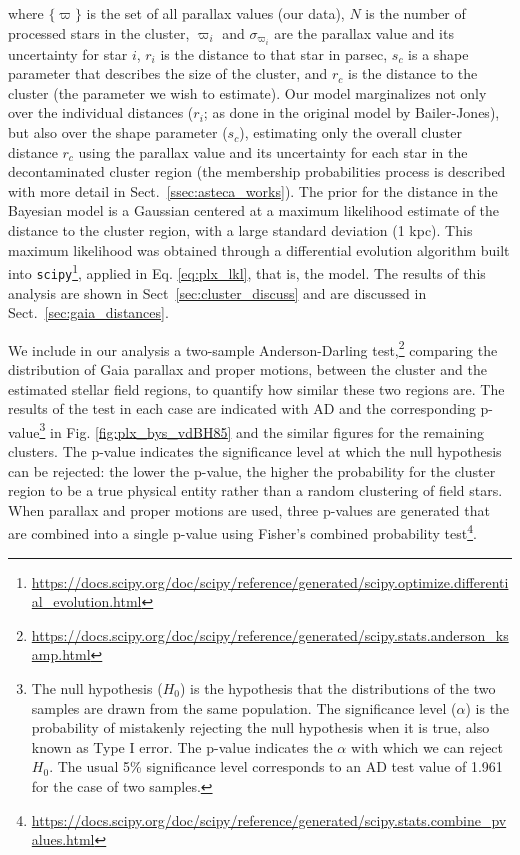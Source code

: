 \documentclass[draft]{aa}
\begin{document}
\noindent where $\{\varpi\}$ is the set of all parallax values (our
data), $N$ is the number of processed stars in the cluster,
$\varpi_{i}$ and $\sigma_{\varpi_{i}}$ are the parallax value and its
uncertainty for star $i$, $r_{i}$ is the distance to that star in parsec,
$s_{c}$ is a shape parameter that describes the size of the cluster, and
$r_{c}$ is the distance to the cluster (the parameter we wish to estimate).
%
Our model marginalizes not only over the individual distances ($r_i$;
as done in the original model by Bailer-Jones), but also
over the shape parameter ($s_c$), estimating only the overall cluster distance
$r_c$ using the parallax value and its uncertainty for each star in the
decontaminated cluster region (the membership probabilities process is
described with more detail in Sect.~\ref{ssec:asteca_works}).
%
The prior for the distance in the Bayesian model is a Gaussian centered at a
maximum likelihood estimate of the distance to the cluster region, with a large
standard deviation (1 kpc). This maximum likelihood was
obtained through a differential evolution algorithm built into
\texttt{scipy}\footnote{\url{https://docs.scipy.org/doc/scipy/reference/generated/scipy.optimize.differential_evolution.html}},
applied in Eq. \ref{eq:plx_lkl}, that is, the model.
%
The results of this analysis are shown in Sect~\ref{sec:cluster_discuss}
and are discussed in Sect.~\ref{sec:gaia_distances}.

We include in our analysis a two-sample Anderson-Darling
test,\footnote{\url{https://docs.scipy.org/doc/scipy/reference/generated/scipy.stats.anderson_ksamp.html}}
comparing the distribution of Gaia parallax and proper motions,
between the cluster and the estimated stellar field regions, to quantify how
similar these two regions are.
The results of the test in each case are indicated with AD and the
corresponding p-value\footnote{The null hypothesis ($H_{0}$) is the
hypothesis that the distributions of the two samples are drawn from the same
population. The significance level ($\alpha$) is the probability of mistakenly
rejecting the null hypothesis when it is true, also known as Type I error. The
p-value indicates the $\alpha$ with which we can reject $H_{0}$. The usual 5\%
significance level corresponds to an AD test value of 1.961 for the case of two
samples.} in Fig. \ref{fig:plx_bys_vdBH85} and the similar figures for
the remaining clusters.
The p-value indicates the significance level at which the null hypothesis
can be rejected: the lower the p-value, the higher the probability
for the cluster region to be a true physical entity rather than a random
clustering of field stars. When parallax and proper motions are used, three
p-values are generated that are combined into a single p-value using Fisher's
combined probability
test\footnote{\url{https://docs.scipy.org/doc/scipy/reference/generated/scipy.stats.combine_pvalues.html}}.
\end{document}
